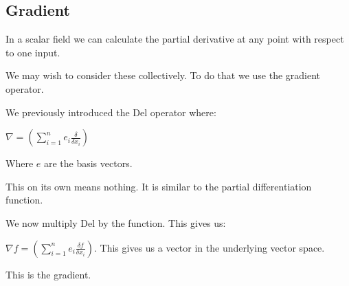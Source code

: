 
\subsection{Gradient}

In a scalar field we can calculate the partial derivative at any point with respect to one input.

We may wish to consider these collectively. To do that we use the gradient operator.

We previously introduced the Del operator where:

\(\nabla =(\sum_{i=1}^n e_i\frac{\delta }{\delta x_i})\)

Where \(e\) are the basis vectors.

This on its own means nothing. It is similar to the partial differentiation function.

We now multiply Del by the function. This gives us:

\(\nabla f=(\sum_{i=1}^n e_i\frac{\delta f}{\delta x_i})\). This gives us a vector in the underlying vector space.

This is the gradient.


